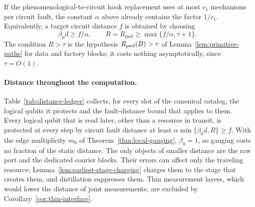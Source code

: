 \documentclass[aps,prx,reprint,superscriptaddress,nofootinbib,floatfix,longbibliography]{revtex4-2}
\theoremstyle{definition}
\begin{document}
If the phenomenological-to-circuit hook replacement uses at most $c_1$
mechanisms per circuit fault, the constant $\alpha$ above already contains the
factor $1/c_1$.  Equivalently, a target circuit distance $f$ is obtained by
choosing
\begin{equation}
 \beta_0d\geq f/\alpha,\qquad R=R_{\mathrm{pad}}\geq\max\{f/\alpha,\tau+1\}.  \tag{A19}
\end{equation}
The condition $R>\tau$ is the hypothesis $R_{\rm pad}(B)>\tau$ of
Lemma~\ref{lem:primitive-paths} for data and factory blocks; it costs nothing
asymptotically, since $\tau=O(1)$.

\paragraph{Distance throughout the computation.}
Table~\ref{tab:distance-ledger} collects, for every slot of the canonical
catalog, the logical qubits it protects and the fault-distance bound that
applies to them.  Every logical qubit that is read later, other than a
resource in transit, is protected at every step by circuit fault distance at
least $\alpha\min\{\beta_0d,R\}\geq f$.  With the edge multiplicity $m_0$ of
Theorem~\ref{thm:local-gauging}, $\beta_0=1$, so gauging costs no fraction of
the static distance.  The only objects of smaller distance are the raw port
and the dedicated courier blocks.  Their errors can affect only the traveling
resource; Lemma~\ref{lem:earliest-stage-charging} charges them to the stage
that creates them, and distillation suppresses them.  Thin measurement layers,
which would lower the distance of joint measurements, are excluded by
Corollary~\ref{cor:thin-interface}.
\end{document}
